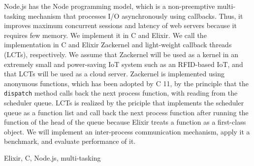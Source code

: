 \documentclass[submit,techrep]{ipsj}
\newcommand{\Rplus}{\protect\hspace{-.1em}\protect\raisebox{.8ex}{\smaller{\smaller\smaller\textbf{+}}}}
\newcommand{\Cpp}{\mbox{C\Rplus\Rplus}\xspace}
\begin{document}
\begin{eabstract}
Node.js has the Node programming model, which is a non-preemptive multi-tasking mechanism that processes I/O asynchronously using callbacks. Thus, it improves maximum concurrent sessions and latency of web servers because it requires few memory. We implement it in \Cpp and Elixir. We call the implementation in \Cpp and Elixir Zackernel and light-weight callback threads (LCTs), respectively. We assume that Zackernel will be used as a kernel in an extremely small and power-saving IoT system such as an RFID-based IoT, and that LCTs will be used as a cloud server. Zackernel is implemented using anonymous functions, which has been adopted by \Cpp 11, by the principle that the {\tt dispatch} method calls back the next process function, with reading from the scheduler queue. LCTs is realized by the priciple that implements the scheduler queue as a function list and call back the next process function after running the function of the head of the queue because Elixir treats a function as a first-class object. We will implement an inter-process communication mechanism, apply it a benchmark, and evaluate performance of it.
\end{eabstract}

\begin{ekeyword}
Elixir,  \Cpp , Node.js, multi-tasking
\end{ekeyword}

\maketitle







\end{document}
